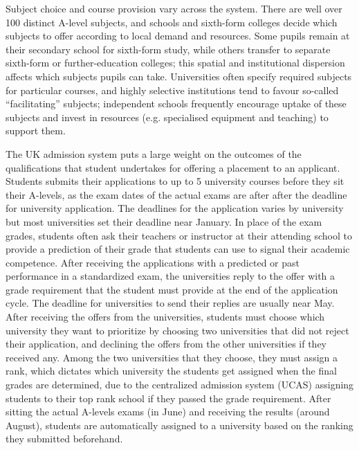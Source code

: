 Subject choice and course provision vary across the system. There are well over 100 distinct A-level subjects, and schools and sixth-form colleges decide which subjects to offer according to local demand and resources. Some pupils remain at their secondary school for sixth-form study, while others transfer to separate sixth-form or further-education colleges; this spatial and institutional dispersion affects which subjects pupils can take. Universities often specify required subjects for particular courses, and highly selective institutions tend to favour so-called ``facilitating'' subjects; independent schools frequently encourage uptake of these subjects and invest in resources (e.g. specialised equipment and teaching) to support them.

The UK admission system puts a large weight on the outcomes of the qualifications that student undertakes for offering a placement to an applicant. Students submits their applications to up to 5 university courses before they sit their A-levels, as the exam dates of the actual exams are after after the deadline for university application. The deadlines for the application varies by university but most universities set their deadline near January. In place of the exam grades, students often ask their teachers or instructor at their attending school to provide a prediction of their grade that students can use to signal their academic competence. After receiving the applications with a predicted or past performance in a standardized exam, the universities reply to the offer with a grade requirement that the student must provide at the end of the application cycle. The deadline for universities to send their replies are usually near May.  After receiving the offers from the universities, students must choose which university they want to prioritize by choosing two universities that did not reject their application, and declining the offers from the other universities if they received any. Among the two universities that they choose, they must assign a rank, which dictates which university the students get assigned when the final grades are determined, due to the centralized admission system (UCAS) assigning students to their top rank school if they passed the grade requirement. After sitting the actual A-levels exams (in June) and receiving the results (around August), students are automatically assigned to a university based on the ranking they submitted beforehand. 

